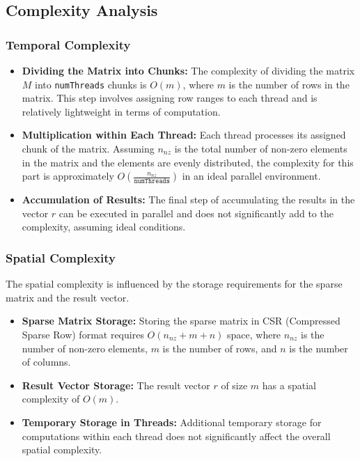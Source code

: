 \documentclass[12pt,oneside]{book} %
\begin{document}
\subsection{Complexity Analysis}
\subsubsection{Temporal Complexity}
\begin{itemize}
    \item \textbf{Dividing the Matrix into Chunks:} The complexity of dividing the matrix \(M\) into \texttt{numThreads} chunks is \(O(m)\), where \(m\) is the number of rows in the matrix. This step involves assigning row ranges to each thread and is relatively lightweight in terms of computation.
    
    \item \textbf{Multiplication within Each Thread:} Each thread processes its assigned chunk of the matrix. Assuming \(n_{nz}\) is the total number of non-zero elements in the matrix and the elements are evenly distributed, the complexity for this part is approximately \(O\left(\frac{n_{nz}}{\texttt{numThreads}}\right)\) in an ideal parallel environment.
    
    \item \textbf{Accumulation of Results:} The final step of accumulating the results in the vector \(r\) can be executed in parallel and does not significantly add to the complexity, assuming ideal conditions.
\end{itemize}

\subsubsection{Spatial Complexity}
The spatial complexity is influenced by the storage requirements for the sparse matrix and the result vector.
\begin{itemize}
    \item \textbf{Sparse Matrix Storage:} Storing the sparse matrix in CSR (Compressed Sparse Row) format requires \(O(n_{nz} + m + n)\) space, where \(n_{nz}\) is the number of non-zero elements, \(m\) is the number of rows, and \(n\) is the number of columns.
    
    \item \textbf{Result Vector Storage:} The result vector \(r\) of size \(m\) has a spatial complexity of \(O(m)\).
    
    \item \textbf{Temporary Storage in Threads:} Additional temporary storage for computations within each thread does not significantly affect the overall spatial complexity.
\end{itemize}
\end{document}
